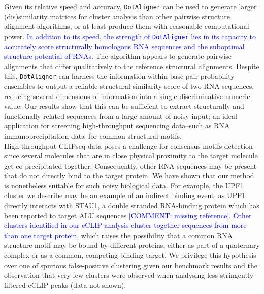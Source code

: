 \documentclass{bmcart}
\newcommand\dotaligner{\texttt{DotAligner}}
\begin{document}
Given its relative speed and accuracy, \dotaligner{} can be used to generate
larger (dis)similarity matrices for cluster analysis than other pairwise
structure alignment algorithms, or at least produce them with reasonable
computational power. \textcolor{blue}{In addition to its speed, the strength of \dotaligner{}
lies in its capacity to accurately score structurally homologous RNA sequences
and the suboptimal structure potential of RNAs.} The algorithm appears to generate
pairwise alignments that differ qualitatively to the reference structural
alignments. Despite this, \dotaligner{} can harness the information within base
pair probability ensembles to output a reliable structural similarity score of
two RNA sequences, reducing several dimensions of information  into a single
discriminative numeric value.  Our results show that this can be sufficient to
extract structurally and functionally related sequences from a large amount of
noisy input; an ideal application for screening high-throughput sequencing
data--such as RNA immunoprecipitation data--for common structural motifs. \\

High-throughput CLIPseq data poses a challenge for consensus motifs detection since
several molecules that are in close physical proximity to the target molecule get 
co-precipitated together. Consequently, other RNA sequences may be present 
that do not directly bind to the target protein. We have shown that our 
 method is nonetheless suitable for such noisy biological data. For example, 
 the UPF1 cluster we describe may be an example of an indirect binding event, 
 as UPF1 directly interacts with STAU1, a double stranded RNA-binding protein which has 
been reported to target ALU sequences \cite{gong2011lncrnas} \textcolor{blue}{[COMMENT: missing reference]}. \textcolor{blue} {Other clusters identified in our eCLIP analysis cluster together sequences from 
more than one target protein}, which raises the possibility 
that a common RNA structure motif may be bound by different proteins, either
as part of a quaternary complex or as a common, competing binding target. 
We privilege this hypothesis over one of spurious false-positive clustering 
given our benchmark results and the observation that very few clusters
were observed when analysing less stringently filtered eCLIP peaks (data not shown). \\
\end{document}
